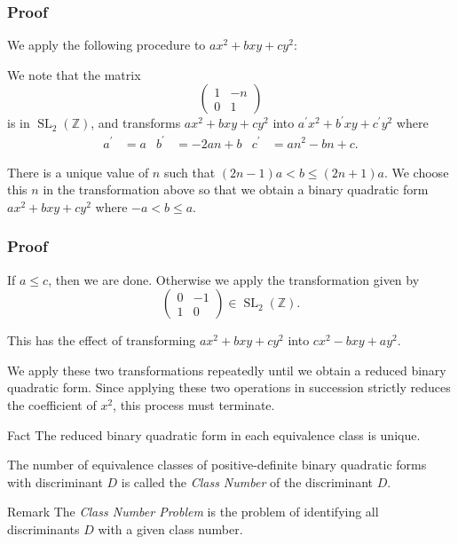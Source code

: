 \documentclass{beamer}
\begin{document}
\begin{frame}
	
	\frametitle{Proof}

	We apply the following procedure to $ax^2 + bxy + cy^2$:

	We note that the matrix
	\[
		\begin{pmatrix} 1 & -n \\ 0 & 1 \end{pmatrix}
	\]
	is in $\operatorname{SL}_2(\mathbb{Z})$, and transforms $ax^2 + bxy + cy^2$ into $a^\prime x^2 + b^\prime xy + c^\prime y^2$ where
	\begin{align*}
		a^\prime & = a & b^\prime & = -2an + b & c^\prime & = an^2 - bn + c.
	\end{align*}
	\pause

	There is a unique value of $n$ such that $(2n - 1)a < b \leq (2n + 1)a$. We choose this $n$ in the transformation above so that we obtain a binary quadratic form $ax^2 + bxy + cy^2$ where $-a < b \leq a$. \pause

\end{frame}

\begin{frame}
	
	\frametitle{Proof}

	If $a \leq c$, then we are done. Otherwise we apply the transformation given by
	\[
		\begin{pmatrix} 0 & -1 \\ 1 & 0 \end{pmatrix} \in \operatorname{SL}_2(\mathbb{Z}).
	\]
	\pause

	This has the effect of transforming $ax^2 + bxy + cy^2$ into $cx^2 - bxy + ay^2$. \pause

	We apply these two transformations repeatedly until we obtain a reduced binary quadratic form. Since applying these two operations in succession strictly reduces the coefficient of $x^2$, this process must terminate.

\end{frame}

\begin{frame}

	\begin{block}{Fact}
		The reduced binary quadratic form in each equivalence class is unique.
	\end{block}

	\begin{definition}
		The number of equivalence classes of positive-definite binary quadratic forms with discriminant $D$ is called the \emph{Class Number} of the discriminant $D$.
	\end{definition}

	\begin{block}{Remark}
		The \emph{Class Number Problem} is the problem of identifying all discriminants $D$ with a given class number.
	\end{block}

\end{frame}
\end{document}
